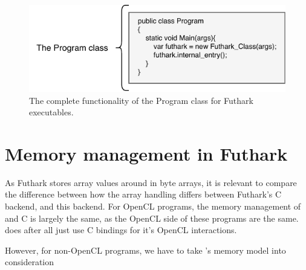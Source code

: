 \begin{figure}[H]
  \centering
  \includegraphics{chapters/figs/csharp/program_class.pdf}
  \caption{The complete functionality of the Program class for Futhark
    executables.}
  \label{fig:programclass}
\end{figure}

\section{Memory management in Futhark \csharp{}}
As Futhark stores array values around in byte arrays, it is relevant to compare
the difference between how the array handling differs between Futhark's C
backend, and this \csharp{} backend.
For OpenCL programs, the memory management of \csharp{} and C is largely the
same, as the OpenCL side of these programs are the same. \csharp{} does after
all just use C bindings for it's OpenCL interactions.

However, for non-OpenCL \csharp{} programs, we have to take \csharp{}'s memory
model into consideration


